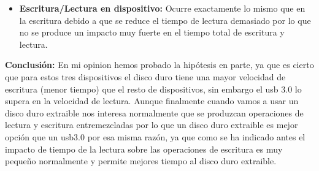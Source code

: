 \documentclass[a4paper, 10pt]{article} %
\begin{document}
\begin{itemize}
\begin{itemize}
\begin{itemize}
\begin{verbatim}
56,6041	23,2206	14,0712
54,8392	23,0947	13,9605
56,378	24,2866	18,1342
56,7686	23,171	16,03675
56,9194	24,2808	17,2674
	\end{verbatim}
	Intervalos de confianza(respectivamente): 
	\begin{verbatim}
[55,2564035274, 57,3473164726]
[22,8459201016, 24,3755598984]
[13,5722208951, 18,2157991049]
	\end{verbatim}
	\begin{figure}[H]
	\centering 
	\texttt{[image: e2l]} 
	\caption{Gráfica de Tiempo de lectura.} 
	\label{contexto:figura} 
	\end{figure}
	\begin{figure}[H]
	\centering 
	\texttt{[image: e2vl]} 
	\caption{Gráfica de Velocidad de lectura.} 
	\label{contexto:figura} 
	\end{figure}
	\item \textbf{Escritura/Lectura en dispositivo:} Ocurre exactamente lo mismo que en la escritura debido a que se reduce el tiempo de lectura demasiado por lo que no se produce un impacto muy fuerte en el tiempo total de escritura y lectura. 
\end{itemize}
\textbf{Conclusión:} En mi opinion hemos probado la hipótesis en parte, ya que es cierto que para estos tres dispositivos el disco duro tiene una mayor velocidad de escritura (menor tiempo) que el resto de dispositivos, sin embargo el usb 3.0 lo supera en la velocidad de lectura. Aunque finalmente cuando vamos a usar un disco duro extraible nos interesa normalmente que se produzcan operaciones de lectura y escritura entremezcladas por lo que un disco duro extraible es mejor opción que un usb3.0 por esa misma razón, ya que como se ha indicado antes el impacto de tiempo de la lectura sobre las operaciones de escritura es muy pequeño normalmente y permite mejores tiempo al disco duro extraible.


\end{itemize}
\end{itemize}
\end{document}
